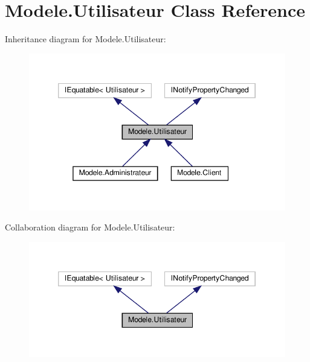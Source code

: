 \hypertarget{classModele_1_1Utilisateur}{}\section{Modele.\+Utilisateur Class Reference}
\label{classModele_1_1Utilisateur}


Inheritance diagram for Modele.\+Utilisateur\+:
\nopagebreak
\begin{figure}[H]
\begin{center}
\leavevmode
\includegraphics[width=346pt]{classModele_1_1Utilisateur__inherit__graph}
\end{center}
\end{figure}


Collaboration diagram for Modele.\+Utilisateur\+:
\nopagebreak
\begin{figure}[H]
\begin{center}
\leavevmode
\includegraphics[width=346pt]{classModele_1_1Utilisateur__coll__graph}
\end{center}
\end{figure}
